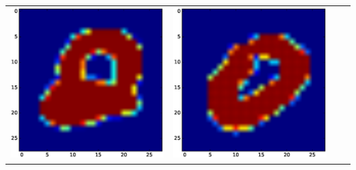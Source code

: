 \documentclass{article}
\begin{document}
\begin{tabular}{cccc}
\includegraphics[scale=.1]{fig/MNIST_771_2_0_771_2.eps} &
\includegraphics[scale=.1]{fig/MNIST_771_2_1_818_0.eps} &

\end{tabular}
\end{document}
